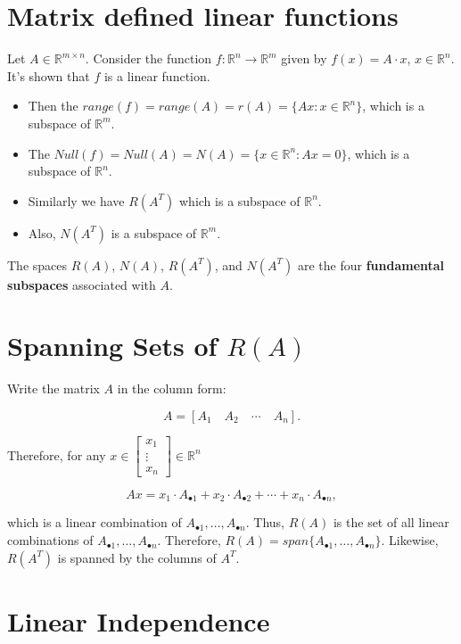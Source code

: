 \documentclass[12pt]{article}
\theoremstyle{definition}
\begin{document}
\section{Matrix defined linear functions}

Let $A \in \mathbb{R}^{m \times n}$. Consider the function 
$f : \mathbb{R}^n \rightarrow \mathbb{R}^m$ given by $f(x) = A \cdot x$, $x \in \mathbb{R}^n$.
It's shown that $f$ is a linear function.
\begin{itemize}
\item Then the  $range(f) = range(A) = r(A) = \{ Ax : x \in \mathbb{R}^n \}$, 
which is a subspace of $\mathbb{R}^m$.

\item The $Null(f) = Null(A) = N(A) = \{ x \in \mathbb{R}^n : Ax = 0 \}$, which is a
subspace of $\mathbb{R}^n$.

\item Similarly we have $R(A^T)$ which is a subspace of $\mathbb{R}^n$.

\item Also, $N(A^T)$ is a subspace of $\mathbb{R}^m$.
\end{itemize}

The spaces $R(A)$, $N(A)$, $R(A^T)$, and $N(A^T)$ are the four \textbf{fundamental subspaces}
associated with $A$.

\section{Spanning Sets of $R(A)$}

Write the matrix $A$ in the column form:


\[ A = [A_{1} \quad A_{2} \quad \cdots \quad A_{n}]. \]


Therefore, for any $x \in \begin{bmatrix} x_1 \\ \vdots \\ x_n \end{bmatrix} \in \mathbb{R}^n$

\[ Ax = x_1 \cdot A_{\bullet 1} + x_2 \cdot A_{\bullet 2} + \cdots + x_n \cdot A_{\bullet n},
\]

which is a linear combination of $A_{\bullet 1} , \ldots, A_{\bullet n}$. Thus, $R(A)$ is
the set of all linear combinations of $A_{\bullet 1} , \ldots, A_{\bullet n}$. Therefore,
$R(A) = span\{A_{\bullet 1}, \ldots, A_{\bullet n}\}$. Likewise, $R(A^T)$ is spanned by the
columns of $A^T$.

\section{Linear Independence}
\end{document}
